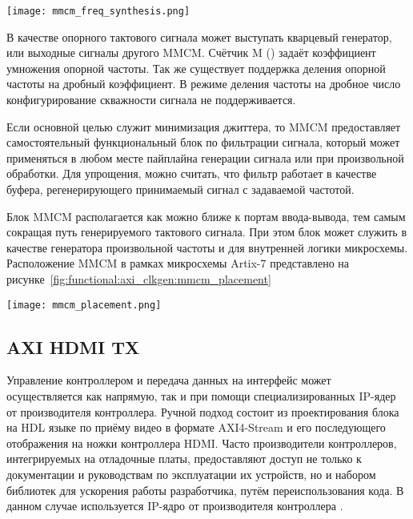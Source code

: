 \begin{center}
  \centering
  \texttt{[image: mmcm\_freq\_synthesis.png]}
  \label{fig:functional:axi_clkgen:mmcm_freq_synthesis}
\end{center}

В качестве опорного тактового сигнала может выступать кварцевый генератор, или выходные
сигналы другого MMCM. Счётчик M () задаёт коэффициент умножения опорной частоты.
Так же существует поддержка деления опорной частоты на дробный коэффициент. В режиме
деления частоты на дробное число конфигурирование скважности сигнала не поддерживается.

Если основной целью служит минимизация джиттера, то MMCM предоставляет самостоятельный
функциональный блок по фильтрации сигнала, который может применяться в любом месте
пайплайна генерации сигнала или при произвольной обработки. Для упрощения, можно считать, что
фильтр работает в качестве буфера, регенерирующего принимаемый сигнал с задаваемой частотой.

Блок MMCM располагается как можно ближе к портам ввода-вывода, тем самым сокращая путь генерируемого тактового сигнала.
При этом блок может служить в качестве генератора произвольной частоты и для внутренней логики микросхемы.
Расположение MMCM в рамках микросхемы Artix-7 представлено на рисунке~\ref{fig:functional:axi_clkgen:mmcm_placement}

\begin{center}
  \centering
  \texttt{[image: mmcm\_placement.png]}
  \label{fig:functional:axi_clkgen:mmcm_placement}
\end{center}

\subsection{AXI HDMI TX}
\label{sec:functional:axi_hdmi_tx}

Управление контроллером  и передача данных на интерфейс может осуществляется как напрямую,
так и при помощи специализированных IP-ядер от производителя контроллера. Ручной подход состоит из
проектирования блока на HDL языке по приёму видео в формате AXI4-Stream и его последующего отображения
на ножки контроллера HDMI. Часто производители контроллеров, интегрируемых на отладочные платы, предоставляют
доступ не только к документации и руководствам по эксплуатации их устройств, но и набором библиотек для
ускорения работы разработчика, путём переиспользования кода. В данном случае используется IP-ядро
от производителя контроллера .

